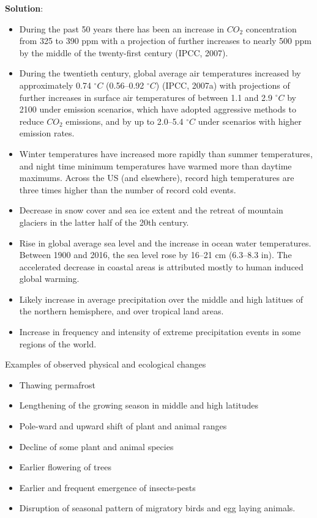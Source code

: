 \documentclass[
  openany]{book}
\newenvironment{solution}{ {\bfseries Solution}:}{}
\begin{document}
\begin{questions}
\begin{solution}
\begin{itemize}
\item During the past 50 years there has been an increase in $CO_2$ concentration from 325 to 390 ppm with a projection of further increases to nearly 500 ppm by the middle of the twenty-first century (IPCC, 2007).
\item During the twentieth century, global average air temperatures increased by approximately 0.74 $^\circ C$ (0.56–0.92 $^\circ C$) (IPCC, 2007a) with projections of further increases in surface air temperatures of between 1.1 and 2.9 $^\circ C$ by 2100 under emission scenarios, which have adopted aggressive methods to reduce $CO_2$ emissions, and by up to 2.0–5.4 $^\circ C$ under scenarios with higher emission rates. 
\item Winter temperatures have increased more rapidly than summer temperatures, and night time minimum temperatures have warmed more than daytime maximums. Across the US (and elsewhere), record high temperatures are three times higher than the number of record cold events.
\item Decrease in snow cover and sea ice extent and the retreat of mountain glaciers in the latter half of the 20th century.
\item Rise in global average sea level and the increase in ocean water temperatures. Between 1900 and 2016, the sea level rose by 16–21 cm (6.3–8.3 in). The accelerated decrease in coastal areas is attributed mostly to human induced global warming.
\item Likely increase in average precipitation over the middle and high latitues of the northern hemisphere, and over tropical land areas.
\item Increase in frequency and intensity of extreme precipitation events in some regions of the world.
\end{itemize}

Examples of observed physical and ecological changes

\begin{itemize}
\item Thawing permafrost
\item Lengthening of the growing season in middle and high latitudes
\item Pole-ward and upward shift of plant and animal ranges
\item Decline of some plant and animal species
\item Earlier flowering of trees
\item Earlier and frequent emergence of insects-pests
\item Disruption of seasonal pattern of migratory birds and egg laying animals.
\end{itemize}


\end{solution}
\end{questions}
\end{document}
